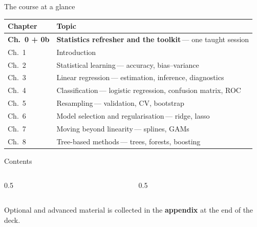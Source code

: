 \documentclass[aspectratio=169,11pt]{beamer}
\begin{document}
\begin{frame}{The course at a glance}
  \vspace{-1.5mm}
  \begin{center}
  \scriptsize
  \setlength{\tabcolsep}{5pt}
  \renewcommand{\arraystretch}{1.30}
  \begin{tabular}{@{\hspace{2pt}}l >{\raggedright\arraybackslash}p{}@{\hspace{2pt}}}
    \toprule
    \textbf{Chapter} & \textbf{Topic} \\
    \midrule
    \rowcolor{accent!18} \textbf{Ch.\ 0 + 0b} & \textbf{Statistics refresher and the toolkit}\,{\color{accent!75!black}--- one taught session} \\
    \rowcolor{black!3} {\color{accent}Ch.\ 1} & Introduction \\
     {\color{accent}Ch.\ 2} & Statistical learning\,{\color{black!45}--- accuracy, bias--variance} \\
    \rowcolor{black!3} {\color{accent}Ch.\ 3} & Linear regression\,{\color{black!45}--- estimation, inference, diagnostics} \\
     {\color{accent}Ch.\ 4} & Classification\,{\color{black!45}--- logistic regression, confusion matrix, ROC} \\
    \rowcolor{black!3} {\color{accent}Ch.\ 5} & Resampling\,{\color{black!45}--- validation, CV, bootstrap} \\
     {\color{accent}Ch.\ 6} & Model selection and regularisation\,{\color{black!45}--- ridge, lasso} \\
    \rowcolor{black!3} {\color{accent}Ch.\ 7} & Moving beyond linearity\,{\color{black!45}--- splines, GAMs} \\
     {\color{accent}Ch.\ 8} & Tree-based methods\,{\color{black!45}--- trees, forests, boosting} \\
    \bottomrule
  \end{tabular}
  \end{center}
\end{frame}

\begin{frame}{Contents}
  \begin{columns}[t]
    \begin{column}{0.5\textwidth}
      \tableofcontents[hideallsubsections,sections={1-6}]
    \end{column}
    \begin{column}{0.5\textwidth}
      \tableofcontents[hideallsubsections,sections={7-12}]
    \end{column}
  \end{columns}
  \vfill
  {\tiny Optional and advanced material is collected in the \textbf{appendix} at the end of the deck.}
\end{frame}
\end{document}
